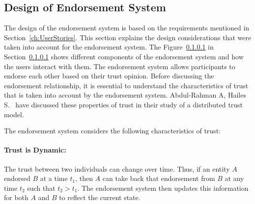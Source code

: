 \subsection{Design of Endorsement System}
The design of the endorsement system is based on the requirements mentioned in
Section~\ref{ch:UserStories}. This section explains the design considerations
that were taken into account for the endorsement system. The Figure~\ref{} in
Section~\ref{} shows different components of the endorsement system and how the
users interact with them. The endorsement system allows participants to endorse
each other based on their trust opinion. Before discussing the endorsement
relationship, it is essential to understand the characteristics of trust that
is taken into account by the endorsement system. Abdul-Rahman A, Hailes
S.~\cite{abdul1998distributed} have discussed these properties of trust in their
study of a distributed trust model. \par
The endorsement system considers the following characteristics of trust:
\paragraph{Trust is Dynamic:}The trust between two individuals can change over
time. Thus, if an entity $A$ endorsed $B$ at a time $t_{1}$, then $A$ can take
back that endorsement from $B$  at any time $t_{2}$ such that $t_{2} > t_{1}$.
The endorsement system then updates this information for both $A$ and $B$ to
reflect the current state.  
